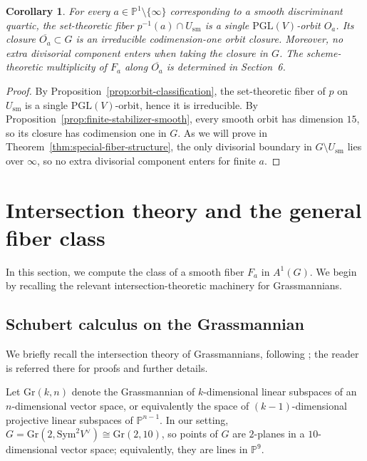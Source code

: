 \documentclass[11pt]{article}
\newtheorem{corollary}[theorem]{Corollary}
\newcommand{\G}{\mathrm{Gr}}
\newcommand{\Pj}{\mathbb P}
\newcommand{\Sym}{\mathrm{Sym}}
\newcommand{\PGL}{\mathrm{PGL}}
\begin{document}
\begin{corollary}\label{cor:fibers-are-orbits}
For every $a\in \Pj^1\setminus\{\infty\}$ corresponding to a smooth discriminant quartic,
the set-theoretic fiber $p^{-1}(a)\cap U_{\mathrm{sm}}$ is a single $\PGL(V)$-orbit $O_a$.
Its closure $\overline{O_a}\subset G$ is an irreducible codimension-one orbit closure.
Moreover, no extra divisorial component enters when taking the closure in $G$.
The scheme-theoretic multiplicity of $F_a$ along $\overline{O_a}$ is determined in Section~6.
\end{corollary}

\begin{proof}
By Proposition~\ref{prop:orbit-classification}, the set-theoretic fiber of $p$ on $U_{\mathrm{sm}}$ is a single
$\PGL(V)$-orbit, hence it is irreducible. By Proposition~\ref{prop:finite-stabilizer-smooth}, every smooth orbit has dimension $15$, so its closure
has codimension one in $G$.
As we will prove in Theorem~\ref{thm:special-fiber-structure}, the only divisorial boundary in
$G\setminus U_{\mathrm{sm}}$ lies over $\infty$, so no extra divisorial component enters for
finite $a$.
\end{proof}

\section{Intersection theory and the general fiber class}

In this section, we compute the class of a smooth fiber $F_a$ in $A^1(G)$. We begin by recalling the relevant intersection-theoretic machinery for Grassmannians.

\subsection{Schubert calculus on the Grassmannian}\label{subsec:schubert}

We briefly recall the intersection theory of Grassmannians, following \cite[Chapters~4--6]{EH}; the reader is referred there for proofs and further details.

Let $\G(k,n)$ denote the Grassmannian of $k$-dimensional linear subspaces of an $n$-dimensional vector space, or equivalently the space of $(k-1)$-dimensional projective linear subspaces of $\Pj^{n-1}$. In our setting, $G=\G(2,\Sym^2 V^\vee)\cong \G(2,10)$, so points of $G$ are $2$-planes in a $10$-dimensional vector space; equivalently, they are lines in $\Pj^9$.
\end{document}
